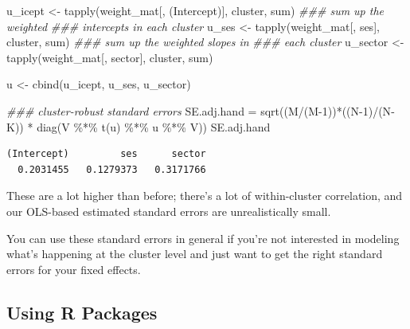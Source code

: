 \documentclass[
  letterpaper,
  DIV=11,
  numbers=noendperiod]{scrreprt}
\newenvironment{Shaded}{}{}
\newcommand{\DecValTok}[1]{\textcolor[rgb]{0.25,0.63,0.44}{#1}}
\newcommand{\DocumentationTok}[1]{\textcolor[rgb]{0.73,0.13,0.13}{\textit{#1}}}
\newcommand{\FunctionTok}[1]{\textcolor[rgb]{0.02,0.16,0.49}{#1}}
\newcommand{\NormalTok}[1]{#1}
\newcommand{\OtherTok}[1]{\textcolor[rgb]{0.00,0.44,0.13}{#1}}
\newcommand{\SpecialCharTok}[1]{\textcolor[rgb]{0.25,0.44,0.63}{#1}}
\newcommand{\StringTok}[1]{\textcolor[rgb]{0.25,0.44,0.63}{#1}}
\begin{document}
\begin{Shaded}
\begin{Highlighting}[]
\NormalTok{u\_icept }\OtherTok{\textless{}{-}} \FunctionTok{tapply}\NormalTok{(weight\_mat[, }\StringTok{\textquotesingle{}(Intercept)\textquotesingle{}}\NormalTok{], cluster, sum) }\DocumentationTok{\#\#\# sum up the weighted }
                                                             \DocumentationTok{\#\#\# intercepts in each cluster}
\NormalTok{u\_ses }\OtherTok{\textless{}{-}} \FunctionTok{tapply}\NormalTok{(weight\_mat[, }\StringTok{\textquotesingle{}ses\textquotesingle{}}\NormalTok{], cluster, sum) }\DocumentationTok{\#\#\# sum up the weighted slopes in }
                                                       \DocumentationTok{\#\#\# each cluster}
\NormalTok{u\_sector }\OtherTok{\textless{}{-}} \FunctionTok{tapply}\NormalTok{(weight\_mat[, }\StringTok{\textquotesingle{}sector\textquotesingle{}}\NormalTok{], cluster, sum)}

\NormalTok{u }\OtherTok{\textless{}{-}} \FunctionTok{cbind}\NormalTok{(u\_icept, u\_ses, u\_sector)}

\DocumentationTok{\#\#\# cluster{-}robust standard errors}
\NormalTok{SE.adj.hand }\OtherTok{=} \FunctionTok{sqrt}\NormalTok{((M}\SpecialCharTok{/}\NormalTok{(M}\DecValTok{{-}1}\NormalTok{))}\SpecialCharTok{*}\NormalTok{((N}\DecValTok{{-}1}\NormalTok{)}\SpecialCharTok{/}\NormalTok{(N}\SpecialCharTok{{-}}\NormalTok{K)) }\SpecialCharTok{*} \FunctionTok{diag}\NormalTok{(V }\SpecialCharTok{\%*\%} \FunctionTok{t}\NormalTok{(u) }\SpecialCharTok{\%*\%}\NormalTok{ u }\SpecialCharTok{\%*\%}\NormalTok{ V)) }
\NormalTok{SE.adj.hand}
\end{Highlighting}
\end{Shaded}

\begin{verbatim}
(Intercept)         ses      sector 
  0.2031455   0.1279373   0.3171766 
\end{verbatim}

These are a lot higher than before; there's a lot of within-cluster
correlation, and our OLS-based estimated standard errors are
unrealistically small.

You can use these standard errors in general if you're not interested in
modeling what's happening at the cluster level and just want to get the
right standard errors for your fixed effects.

\subsection{Using R Packages}\label{using-r-packages}
\end{document}
